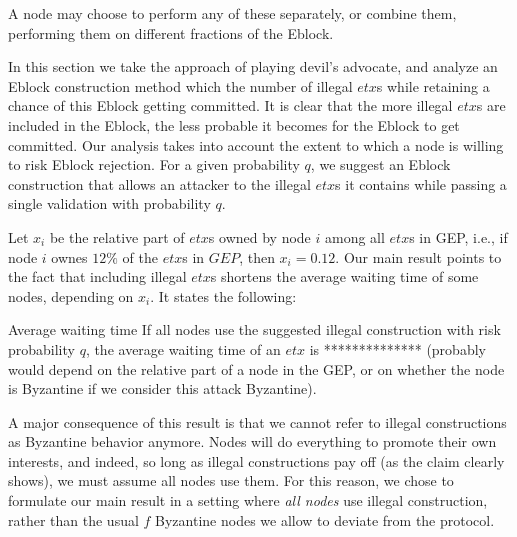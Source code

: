 A node may choose to perform any of these  separately, or combine them, performing them on different fractions of the Eblock.

In this section we take the approach of playing devil's advocate, and analyze an Eblock construction method which  the number of illegal $etx$s while retaining a chance of this Eblock getting committed. It is clear that the more illegal $etx$s are included in the Eblock, the less probable it becomes for the Eblock to get committed. Our analysis takes into account the extent to which a node is willing to risk Eblock rejection. For a given probability $q$, we suggest an Eblock construction that allows an attacker to  the illegal $etx$s it contains while passing a single validation with probability $q$. 

Let $x_i$ be the relative part of $etx$s owned by node $i$ among all $etx$s in GEP, i.e., if node $i$ ownes $12\%$ of the $etx$s in $GEP$, then $x_i=0.12$. Our main result points to the fact that including illegal $etx$s shortens the average waiting time of some nodes, depending on $x_i$. It states the following: 
\begin{claim} {Average waiting time}
	If all nodes use the suggested illegal construction with risk probability $q$, the average waiting time of an $etx$ is ************** (probably would depend on the relative part of a node in the GEP, or on whether the node is Byzantine if we consider this attack Byzantine).
\end{claim}


A major consequence of this result is that we cannot refer to illegal constructions as Byzantine behavior anymore. Nodes will do everything to promote their own interests, and indeed, so long as illegal constructions pay off (as the claim clearly shows), we must assume all nodes use them. For this reason, we chose to formulate our main result in a setting where \textit{all nodes} use illegal construction, rather than the usual $f$ Byzantine nodes we allow to deviate from the protocol. 


